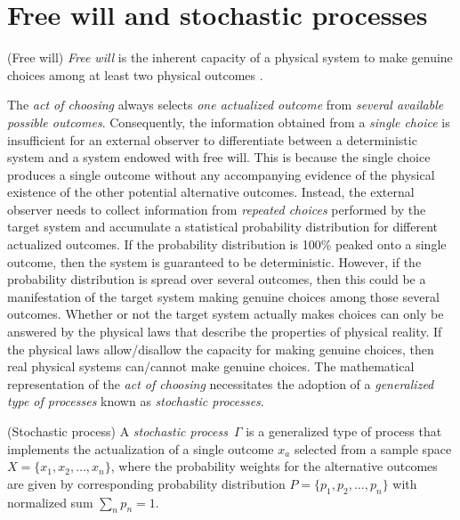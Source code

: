 \documentclass{ws-ijmpb}
\begin{document}
\section{Free will and stochastic processes}
\label{S5}

\begin{definition}
(Free will) \emph{Free will} is the inherent capacity of a physical
system to make genuine choices among at least two physical outcomes
\cite{Georgiev2017,Georgiev2021}.
\end{definition}

The \emph{act of choosing} always selects \emph{one actualized outcome}
from \emph{several available possible outcomes}. Consequently, the
information obtained from a \emph{single choice} is insufficient for
an external observer to differentiate between a deterministic system
and a system endowed with free will. This is because the single choice
produces a single outcome without any accompanying evidence of the
physical existence of the other potential alternative outcomes. Instead,
the external observer needs to collect information from \emph{repeated
choices} performed by the target system and accumulate a statistical
probability distribution for different actualized outcomes. If the
probability distribution is 100\% peaked onto a single outcome, then
the system is guaranteed to be deterministic. However, if the probability
distribution is spread over several outcomes, then this could be a
manifestation of the target system making genuine choices among those
several outcomes. Whether or not the target system actually makes
choices can only be answered by the physical laws that describe the
properties of physical reality. If the physical laws allow/disallow
the capacity for making genuine choices, then real physical systems
can/cannot make genuine choices. The mathematical representation of the
\emph{act of choosing} necessitates the adoption of a \emph{generalized
type of processes} known as \emph{stochastic processes}.

\begin{definition}
(Stochastic process) A \emph{stochastic process}~$\Gamma$ is a generalized
type of process that implements
the actualization of a single outcome $x_{a}$ selected from a sample
space $X=\{x_{1},x_{2},\ldots,x_{n}\}$, where the probability weights
for the alternative outcomes are given by corresponding probability
distribution $P=\{p_{1},p_{2},\ldots,p_{n}\}$ with normalized sum $\sum_{n}p_{n}=1$.
\end{definition}
\end{document}
